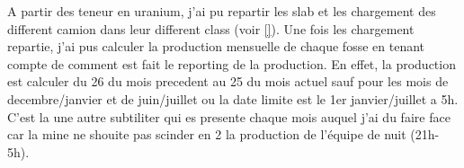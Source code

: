 A partir des teneur en uranium, j'ai pu repartir les slab et les chargement des different camion dans leur different class (voir \ref{}). Une fois les chargement repartie, j'ai pus calculer la production mensuelle de chaque fosse en tenant compte de comment est fait le reporting de la production. En effet, la production est calculer du 26 du mois precedent au 25 du mois actuel sauf pour les mois de decembre/janvier et de juin/juillet ou la date limite est le 1er janvier/juillet a 5h. C'est la une autre subtiliter qui es presente chaque mois auquel j'ai du faire face car la mine ne shouite pas scinder en 2 la production de l'équipe de nuit (21h-5h).
